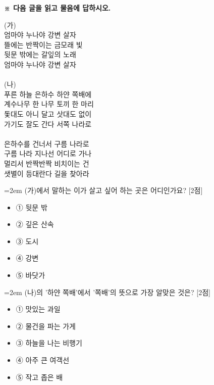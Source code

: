 \documentclass[12pt,a4paper]{article}
\newcommand{\qnum}[1]{%
  \tikz[baseline=(num.base)]{%
    \node[circle, fill=numCircle, text=white, inner sep=0pt,
          minimum size=18pt, font=\small\bfseries] (num) {#1};%
  }%
}
\newcommand{\pts}[1]{%
  \hfill\textcolor{ptsBadge}{[#1점]}%
}
\begin{document}
\vspace{4mm}
{\small\textbf{※ 다음 글을 읽고 물음에 답하시오.}}
\vspace{2mm}
\begin{tcolorbox}[passage]
(가) \\{}
엄마야 누나야 강변 살자 \\{}
뜰에는 반짝이는 금모래 빛 \\{}
뒷문 밖에는 갈잎의 노래 \\{}
엄마야 누나야 강변 살자 \\{}
\vspace{4pt} \\{}
(나) \\{}
푸른 하늘 은하수 하얀 쪽배에 \\{}
계수나무 한 나무 토끼 한 마리 \\{}
돛대도 아니 달고 삿대도 없이 \\{}
가기도 잘도 간다 서쪽 나라로 \\{}
\vspace{4pt} \\{}
은하수를 건너서 구름 나라로 \\{}
구름 나라 지나선 어디로 가나 \\{}
멀리서 반짝반짝 비치이는 건 \\{}
샛별이 등대란다 길을 찾아라
\end{tcolorbox}
\vspace{3mm}
\begin{samepage}
{\hangindent=2em
\qnum{33}\enspace (가)에서 말하는 이가 살고 싶어 하는 곳은 어디인가요? \pts{2}
\par}

\vspace{3mm}
\begin{itemize}[leftmargin=2.5em, labelsep=0.3em, label={}, itemsep=4pt, parsep=1pt, topsep=0pt]
  \item ① 뒷문 밖
  \item ② 깊은 산속
  \item ③ 도시
  \item ④ 강변
  \item ⑤ 바닷가
\end{itemize}
\end{samepage}

\vspace{4mm}
\begin{samepage}
{\hangindent=2em
\qnum{34}\enspace (나)의 '하얀 쪽배'에서 '쪽배'의 뜻으로 가장 알맞은 것은? \pts{2}
\par}

\vspace{3mm}
\begin{itemize}[leftmargin=2.5em, labelsep=0.3em, label={}, itemsep=4pt, parsep=1pt, topsep=0pt]
  \item ① 맛있는 과일
  \item ② 물건을 파는 가게
  \item ③ 하늘을 나는 비행기
  \item ④ 아주 큰 여객선
  \item ⑤ 작고 좁은 배
\end{itemize}
\end{samepage}
\end{document}
